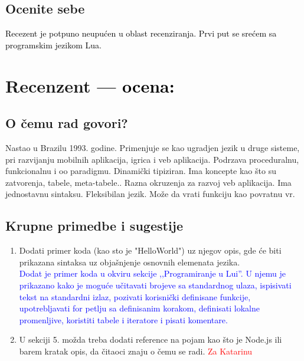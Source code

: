 \documentclass[a4paper]{report}
\newcommand{\odgovor}[1]{\textcolor{black}{#1}}
\newcommand{\odgovorAutora}[1]{\textcolor{blue}{#1}}
\newcommand{\note}[1]{\textcolor{red}{#1}}
\begin{document}
\section{Ocenite sebe}
\odgovor{
Recezent je potpuno neupućen u oblast recenziranja. Prvi put se srećem sa programskim jezikom Lua. 
}
\chapter{Recenzent \odgovor{--- ocena:} }


\section{O čemu rad govori?}

Nastao u Brazilu 1993. godine. Primenjuje se kao ugradjen jezik u druge sisteme, pri razvijanju mobilnih aplikacija, igrica i veb aplikacija. Podrzava proceduralnu, funkcionalnu i oo paradigmu. Dinami\v cki tipiziran. Ima koncepte kao \v sto su zatvorenja, tabele, meta-tabele.. Razna okruzenja za razvoj veb aplikacija. Ima jednostavnu sintaksu. Fleksibilan jezik. Mo\v ze da vrati funkciju kao povratnu vr.

\section{Krupne primedbe i sugestije}
  
  \begin{enumerate}
    \item  Dodati primer koda (kao sto je "HelloWorld") uz njegov opis, gde \' ce biti prikazana sintaksa uz obja\v snjenje osnovnih elemenata jezika. \\
\odgovorAutora{Dodat je primer koda u okviru sekcije ,,Programiranje u Lui''. U njemu je prikazano kako je moguće učitavati brojeve sa standardnog ulaza, ispisivati tekst na standardni izlaz, pozivati korisnički definisane funkcije, upotrebljavati for petlju sa definisanim korakom, definisati lokalne promenljive, koristiti tabele i iteratore i pisati komentare.}
    \item U sekciji 5. mo\v zda treba dodati reference na pojam kao \v sto je Node.js ili barem kratak opis, da \v citaoci znaju o \v cemu se radi. \note{Za Katarinu}
  \end{enumerate}
\end{document}
